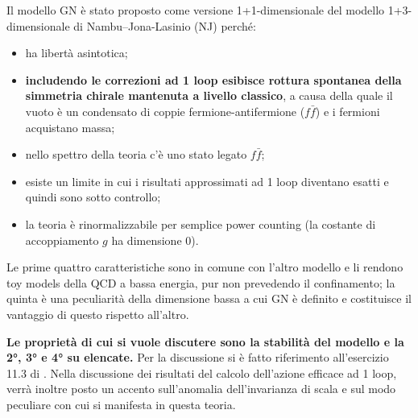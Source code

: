 \documentclass[a4paper,11pt]{amsart}
\newcommand{\nl}{\vskip 0.3cm}
\begin{document}
Il modello GN è stato proposto come versione 1+1-dimensionale del modello 1+3-dimensionale di Nambu–Jona-Lasinio (NJ) \cite{Gross1974} perché:
\begin{itemize}
 \item ha libertà asintotica;
 \item \textbf{includendo le correzioni ad 1 loop esibisce rottura spontanea della simmetria chirale mantenuta a livello classico}, a causa della quale il vuoto è un condensato di coppie fermione-antifermione ($f \bar{f}$) e i fermioni acquistano massa;
 \item nello spettro della teoria c'è uno stato legato $f \bar{f}$;
 \item esiste un limite in cui i risultati approssimati ad 1 loop diventano esatti e quindi sono sotto controllo;
 \item la teoria è rinormalizzabile per semplice power counting (la costante di accoppiamento $g$ ha dimensione 0).
\end{itemize}
Le prime quattro caratteristiche sono in comune con l'altro modello e li rendono toy models della QCD a bassa energia, pur non prevedendo il confinamento; 
la quinta è una peculiarità della dimensione bassa a cui GN è definito e costituisce il vantaggio di questo rispetto all'altro.
\nl

\textbf{Le proprietà di cui si vuole discutere sono la stabilità del modello e la 2°, 3° e 4° su elencate.} Per la discussione si è fatto riferimento all'esercizio 11.3 di \cite{Peskin1995}.
Nella discussione dei risultati del calcolo dell'azione efficace ad 1 loop, verrà inoltre posto un accento sull'anomalia dell'invarianza di scala e sul modo peculiare con cui si manifesta in questa teoria.\\
\vspace{0.4 cm}
\end{document}
